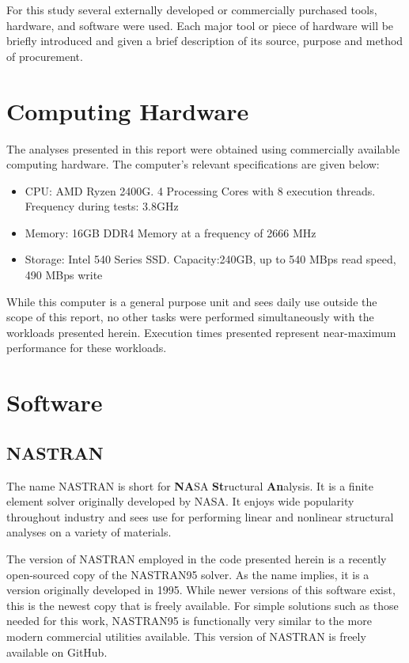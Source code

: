 For this study several externally developed or commercially purchased tools, hardware, and software were used. Each major tool or piece of hardware will be briefly introduced and given a brief description of its source, purpose and method of procurement.

\section{Computing Hardware}
The analyses presented in this report were obtained using commercially available computing hardware. The computer's relevant specifications are given below: 

\begin{itemize}
\item CPU: AMD Ryzen 2400G. 4 Processing Cores with 8 execution threads. Frequency during tests: 3.8GHz
\item Memory: 16GB DDR4 Memory at a frequency of 2666 MHz
\item Storage: Intel 540 Series SSD. Capacity:240GB, up to 540 MBps read speed, 490 MBps write
\end{itemize}

While this computer is a general purpose unit and sees daily use outside the scope of this report, no other tasks were performed simultaneously with the workloads presented herein. Execution times presented represent near-maximum performance for these workloads. 

\section{Software}
\subsection{NASTRAN}
The name NASTRAN is short for \textbf{NA}SA \textbf{St}ructural \textbf{An}alysis. It is a finite element solver originally developed by NASA. It enjoys wide popularity throughout industry and sees use for performing linear and nonlinear structural analyses on a variety of materials\cite{nasa-tech}. 

The version of NASTRAN employed in the code presented herein is a recently open-sourced copy of the NASTRAN95 solver. As the name implies, it is a version originally developed in 1995. While newer versions of this software exist, this is the newest copy that is freely available. For simple solutions such as those needed for this work, NASTRAN95 is functionally very similar to the more modern commercial utilities available. This version of NASTRAN is freely available on GitHub\cite{nasa-git}. 


